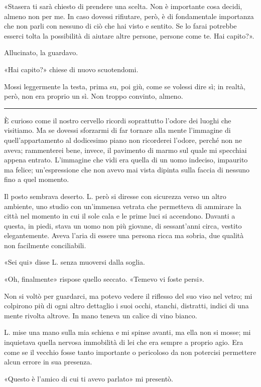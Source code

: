 «Stasera ti sarà chiesto di prendere una scelta. Non è importante cosa decidi, almeno non per me. In
caso dovessi rifiutare, però, è di fondamentale importanza che non parli con nessuno di ciò che hai
visto e sentito. Se lo farai potrebbe esserci tolta la possibilità di aiutare altre persone, persone
come te. Hai capito?».

Allucinato, la guardavo.

«Hai capito?» chiese di nuovo scuotendomi.

Mossi leggermente la testa, prima su, poi giù, come se volessi dire sì; in realtà, però, non era
proprio un sì. Non troppo convinto, almeno.

\plainbreak{1}

È curioso come il nostro cervello ricordi soprattutto l'odore dei luoghi che visitiamo. Ma se
dovessi sforzarmi di far tornare alla mente l'immagine di quell'appartamento al dodicesimo piano non
ricorderei l'odore, perché non ne aveva; rammenterei bene, invece, il pavimento di marmo sul quale
mi specchiai appena entrato. L'immagine che vidi era quella di un uomo indeciso, impaurito ma
felice; un'espressione che non avevo mai vista dipinta sulla faccia di nessuno fino a quel momento.

Il posto sembrava deserto. L. però si diresse con sicurezza verso un altro ambiente, uno studio con
un'immensa vetrata che permetteva di ammirare la città nel momento in cui il sole cala e le prime
luci si accendono. Davanti a questa, in piedi, stava un uomo non più giovane, di sessant'anni circa,
vestito elegantemente. Aveva l'aria di essere una persona ricca ma sobria, due qualità non
facilmente conciliabili.

«Sei qui» disse L. senza muoversi dalla soglia.

«Oh, finalmente» rispose quello seccato. «Temevo vi foste persi».

Non si voltò per guardarci, ma potevo vedere il riflesso del suo viso nel vetro; mi colpirono più di
ogni altro dettaglio i suoi occhi, stanchi, distratti, indici di una mente rivolta altrove. In mano
teneva un calice di vino bianco.

L. mise una mano sulla mia schiena e mi spinse avanti, ma ella non si mosse; mi inquietava quella
nervosa immobilità di lei che era sempre a proprio agio. Era come se il vecchio fosse tanto
importante o pericoloso da non potercisi permettere alcun errore in sua presenza.

«Questo è l'amico di cui ti avevo parlato» mi presentò.

